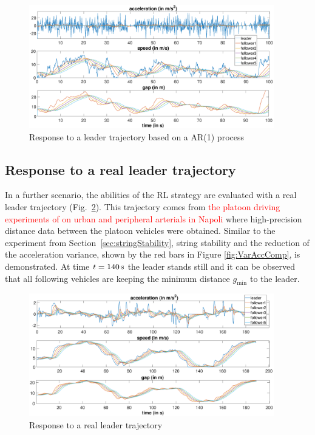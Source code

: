 \documentclass[review]{elsarticle}
\providecommand{\red}[1]{\textcolor{red}{#1}}
\providecommand{\martin}[1]{\red{#1}} %
\providecommand{\sub}[1]{_{\mathrm{#1}}}  %
\providecommand{\3}{{\ss}}
\begin{document}
\begin{figure}
	\centering
	\includegraphics[width=0.95\textwidth]{images/AR1Kolonne}
	\caption{Response to a leader trajectory based on a AR(1) process}
	\label{fig:AR1Kolonne}
\end{figure}


\subsection{Response to a real leader trajectory}

In a further scenario, the abilities of the RL strategy are evaluated
with a real leader trajectory (Fig.~\ref{fig:PunzoKolonne}). This
trajectory comes from \martin{the platoon driving experiments of
  \cite{punzo2005nonstationary} on urban and peripheral arterials in Napoli}
where high-precision distance data between the platoon
vehicles were obtained. Similar to the experiment from
Section~\ref{sec:stringStability}, string stability and the reduction
of  the acceleration variance, shown by the red bars in Figure
\ref{fig:VarAccComp}, is demonstrated. At time $t = \unit[140]{s}$ the leader
stands still and it can be observed that all following vehicles are
keeping the minimum distance $g\sub{min}$ to the leader.  


\begin{figure}
	\centering
	\includegraphics[width=0.95\textwidth]{images/PunzoKolonne}
	\caption{Response to a real leader trajectory}
	\label{fig:PunzoKolonne}
\end{figure}
\end{document}

